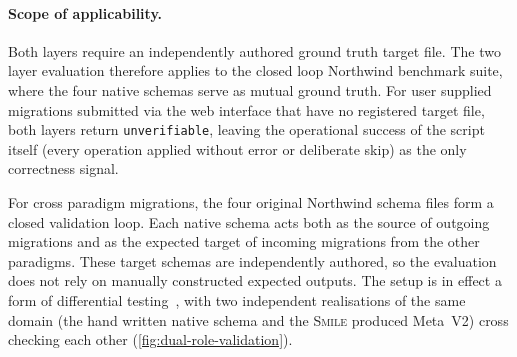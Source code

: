   \paragraph{Scope of applicability.}
  Both layers require an independently authored ground truth target file.
  The two layer evaluation therefore applies to the closed loop Northwind
  benchmark suite, where the four native schemas serve as mutual ground
  truth. For user supplied migrations submitted via the web interface that
  have no registered target file, both layers return \texttt{unverifiable},
  leaving the operational success of the script itself (every operation
  applied without error or deliberate skip) as the only correctness signal.

  For cross paradigm migrations, the four original Northwind schema files
  form a closed validation loop. Each native schema acts both as the source
  of outgoing migrations and as the expected target of incoming migrations
  from the other paradigms. These target schemas are independently authored,
  so the evaluation does not rely on manually constructed expected outputs.
  The setup is in effect a form of differential
  testing~\cite{mckeeman1998differential}, with two independent realisations
  of the same domain (the hand written native schema and the \textsc{Smile}
  produced Meta~V2) cross checking each other (\autoref{fig:dual-role-validation}).

